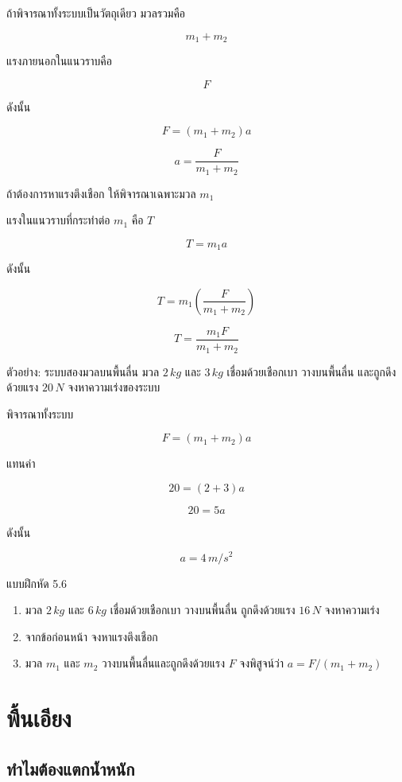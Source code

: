 ถ้าพิจารณาทั้งระบบเป็นวัตถุเดียว มวลรวมคือ

\[
m_1+m_2
\]

แรงภายนอกในแนวราบคือ

\[
F
\]

ดังนั้น

\[
F=(m_1+m_2)a
\]

\[
a=\frac{F}{m_1+m_2}
\]

ถ้าต้องการหาแรงตึงเชือก ให้พิจารณาเฉพาะมวล $m_1$

แรงในแนวราบที่กระทำต่อ $m_1$ คือ $T$

\[
T=m_1a
\]

ดังนั้น

\[
T=m_1\left(\frac{F}{m_1+m_2}\right)
\]

\[
T=\frac{m_1F}{m_1+m_2}
\]

\begin{examplebox}{ตัวอย่าง: ระบบสองมวลบนพื้นลื่น}
มวล $2\,\si{kg}$ และ $3\,\si{kg}$ เชื่อมด้วยเชือกเบา วางบนพื้นลื่น และถูกดึงด้วยแรง $20\,\si{N}$ จงหาความเร่งของระบบ

พิจารณาทั้งระบบ

\[
F=(m_1+m_2)a
\]

แทนค่า

\[
20=(2+3)a
\]

\[
20=5a
\]

ดังนั้น

\[
\boxed{a=4\,\si{m/s^2}}
\]
\end{examplebox}

\begin{exercisebox}{แบบฝึกหัด 5.6}
\begin{enumerate}
    \item มวล $2\,\si{kg}$ และ $6\,\si{kg}$ เชื่อมด้วยเชือกเบา วางบนพื้นลื่น ถูกดึงด้วยแรง $16\,\si{N}$ จงหาความเร่ง
    \item จากข้อก่อนหน้า จงหาแรงตึงเชือก
    \item มวล $m_1$ และ $m_2$ วางบนพื้นลื่นและถูกดึงด้วยแรง $F$ จงพิสูจน์ว่า $a=F/(m_1+m_2)$
\end{enumerate}
\end{exercisebox}

\section{พื้นเอียง}

\subsection{ทำไมต้องแตกน้ำหนัก}

